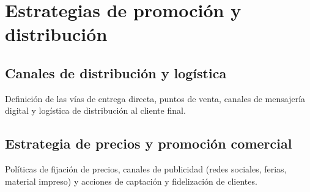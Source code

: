 \section{Estrategias de promoción y distribución}
\label{sec:estrategia_promocion}

\subsection{Canales de distribución y logística}
Definición de las vías de entrega directa, puntos de venta, canales de mensajería digital y logística de distribución al cliente final.

\subsection{Estrategia de precios y promoción comercial}
Políticas de fijación de precios, canales de publicidad (redes sociales, ferias, material impreso) y acciones de captación y fidelización de clientes.

